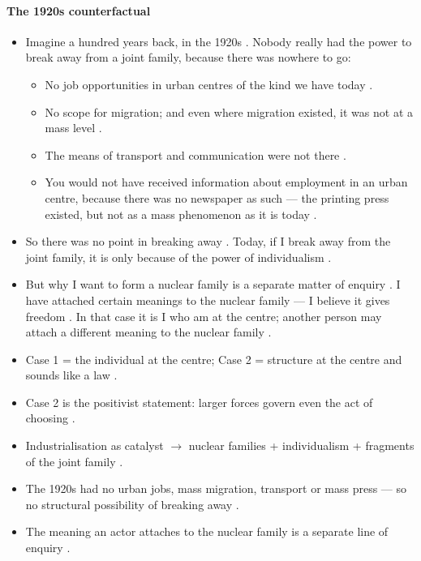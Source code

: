 \paragraph{The 1920s counterfactual}
\begin{itemize}
    \item Imagine a hundred years back, in the 1920s . Nobody really had the power to break away from a joint family, because there was nowhere to go: 
    \begin{itemize}
        \item No job opportunities in urban centres of the kind we have today .
        \item No scope for migration; and even where migration existed, it was not at a mass level .
        \item The means of transport and communication were not there .
        \item You would not have received information about employment in an urban centre, because there was no newspaper as such --- the printing press existed, but not as a mass phenomenon as it is today .
    \end{itemize}
    \item So there was no point in breaking away . Today, if I break away from the joint family, it is only because of the power of individualism .
    \item But why I want to form a nuclear family is a separate matter of enquiry . I have attached certain meanings to the nuclear family --- I believe it gives freedom . In that case it is I who am at the centre; another person may attach a different meaning to the nuclear family .
\end{itemize}

\begin{QuickRevision}
\begin{itemize}
    \item Case 1 = the individual at the centre; Case 2 = structure at the centre and sounds like a law .
    \item Case 2 is the positivist statement: larger forces govern even the act of choosing .
    \item Industrialisation as catalyst $\rightarrow$ nuclear families + individualism + fragments of the joint family .
    \item The 1920s had no urban jobs, mass migration, transport or mass press --- so no structural possibility of breaking away .
    \item The meaning an actor attaches to the nuclear family is a separate line of enquiry .
\end{itemize}
\end{QuickRevision}

